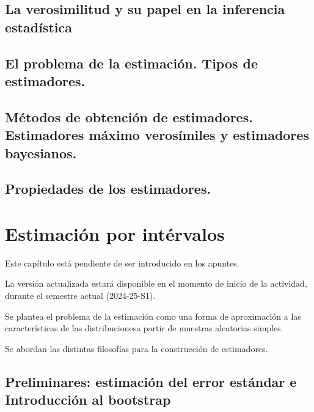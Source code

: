 \documentclass[
  a4paper,
  DIV=11,
  numbers=noendperiod]{scrreprt}
\begin{document}
\section{La verosimilitud y su papel en la inferencia
estadística}\label{la-verosimilitud-y-su-papel-en-la-inferencia-estaduxedstica}

\section{El problema de la estimación. Tipos de
estimadores.}\label{el-problema-de-la-estimaciuxf3n.-tipos-de-estimadores.}

\section{Métodos de obtención de estimadores. Estimadores máximo
verosímiles y estimadores
bayesianos.}\label{muxe9todos-de-obtenciuxf3n-de-estimadores.-estimadores-muxe1ximo-verosuxedmiles-y-estimadores-bayesianos.}

\section{Propiedades de los
estimadores.}\label{propiedades-de-los-estimadores.}


\chapter{Estimación por
intérvalos}\label{estimaciuxf3n-por-intuxe9rvalos}

Este capítulo está pendiente de ser introducido en los apuntes.

La versión actualizada estará disponible en el momento de inicio de la
actividad, durante el semestre actual (2024-25-S1).

Se plantea el problema de la estimación como una forma de aproximación a
las características de las distribucionesa partir de muestras aleatorias
simples.

Se abordan las distintas filosofías para la construcción de estimadores.

\section{Preliminares: estimación del error estándar e Introducción al
bootstrap}\label{preliminares-estimaciuxf3n-del-error-estuxe1ndar-e-introducciuxf3n-al-bootstrap}
\end{document}
